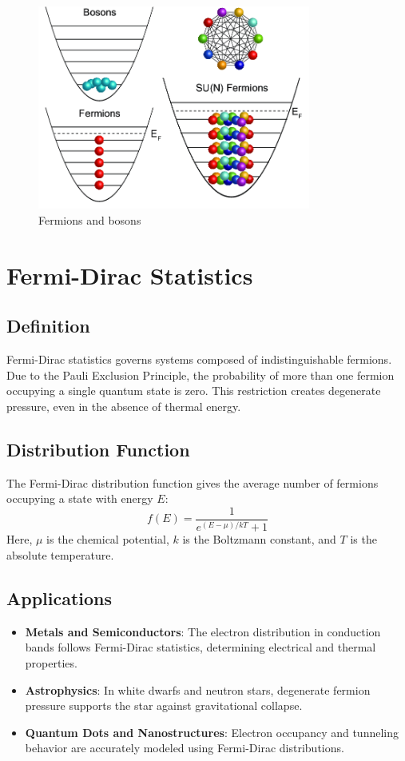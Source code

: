 \documentclass[12pt,a4paper]{article}
\begin{document}
\begin{figure}[H]
    \centering
    \includegraphics[width=0.8\textwidth]{fermions.png}
    \caption{Fermions and bosons}
\end{figure}

\section{Fermi-Dirac Statistics}
\subsection{Definition}
Fermi-Dirac statistics governs systems composed of indistinguishable fermions. Due to the Pauli Exclusion Principle, the probability of more than one fermion occupying a single quantum state is zero. This restriction creates degenerate pressure, even in the absence of thermal energy.

\subsection{Distribution Function}
The Fermi-Dirac distribution function gives the average number of fermions occupying a state with energy $E$:
\begin{equation}
f(E) = \frac{1}{e^{(E - \mu)/kT} + 1}
\end{equation}
Here, $\mu$ is the chemical potential, $k$ is the Boltzmann constant, and $T$ is the absolute temperature.

\subsection{Applications}
\begin{itemize}
    \item \textbf{Metals and Semiconductors}: The electron distribution in conduction bands follows Fermi-Dirac statistics, determining electrical and thermal properties.
    \item \textbf{Astrophysics}: In white dwarfs and neutron stars, degenerate fermion pressure supports the star against gravitational collapse.
    \item \textbf{Quantum Dots and Nanostructures}: Electron occupancy and tunneling behavior are accurately modeled using Fermi-Dirac distributions.
\end{itemize}
\end{document}
